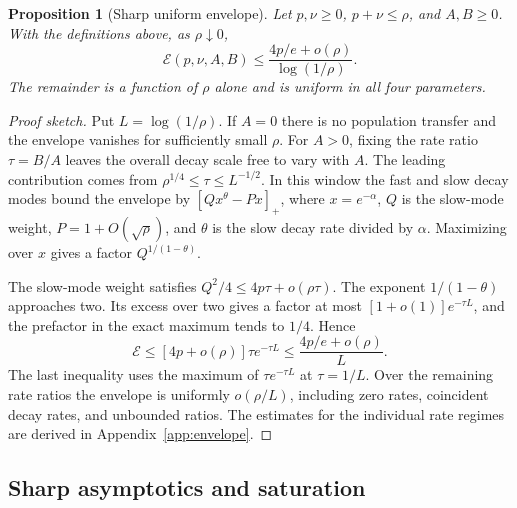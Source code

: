 \documentclass[aps,pra,reprint,amsmath,amssymb,nofootinbib,floatfix,longbibliography]{revtex4-2}
\theoremstyle{aps}
\newtheorem{proposition}[theorem]{Proposition}
\begin{document}
\begin{proposition}[Sharp uniform envelope]\label{prop:envelope}
Let $p,\nu\ge0$, $p+\nu\le\rho$, and $A,B\ge0$. With the definitions above, as $\rho\downarrow0$,
\begin{equation}\label{eq:refined}
 \mathcal E(p,\nu,A,B)
 \le\frac{4p/e+o(\rho)}{\log(1/\rho)}.
\end{equation}
The remainder is a function of $\rho$ alone and is uniform in all four parameters.
\end{proposition}
\begin{proof}[Proof sketch]
Put $L=\log(1/\rho)$. If $A=0$ there is no population transfer and the envelope vanishes for sufficiently small $\rho$. For $A>0$, fixing the rate ratio $\tau=B/A$ leaves the overall decay scale free to vary with $A$. The leading contribution comes from $\rho^{1/4}\le\tau\le L^{-1/2}$. In this window the fast and slow decay modes bound the envelope by $[Qx^\theta-Px]_+$, where $x=e^{-\alpha}$, $Q$ is the slow-mode weight, $P=1+O(\sqrt\rho)$, and $\theta$ is the slow decay rate divided by $\alpha$. Maximizing over $x$ gives a factor $Q^{1/(1-\theta)}$.

The slow-mode weight satisfies $Q^2/4\le 4p\tau+o(\rho\tau)$. The exponent $1/(1-\theta)$ approaches two. Its excess over two gives a factor at most $[1+o(1)]e^{-\tau L}$, and the prefactor in the exact maximum tends to $1/4$. Hence
\begin{equation}\label{eq:leading-core}
 \mathcal E\le[4p+o(\rho)]\tau e^{-\tau L}
 \le\frac{4p/e+o(\rho)}L.
\end{equation}
The last inequality uses the maximum of $\tau e^{-\tau L}$ at $\tau=1/L$. Over the remaining rate ratios the envelope is uniformly $o(\rho/L)$, including zero rates, coincident decay rates, and unbounded ratios. The estimates for the individual rate regimes are derived in Appendix~\ref{app:envelope}.
\end{proof}

\subsection{Sharp asymptotics and saturation}
\end{document}
